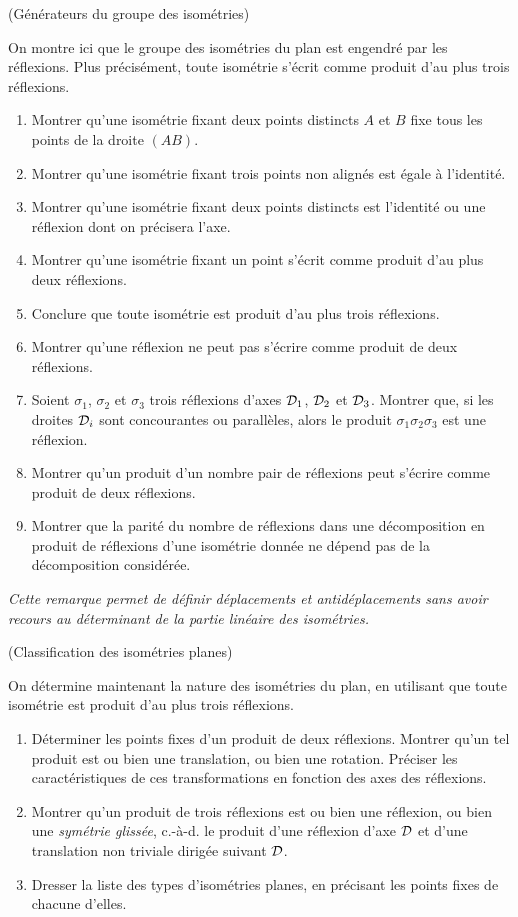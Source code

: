 \documentclass[a4paper,11pt,reqno]{amsart}
\begin{document}
\begin{exo} (Générateurs du groupe des isométries)

  On montre ici que le groupe des isométries du plan est engendré par les réflexions. Plus précisément, toute isométrie s'écrit comme produit d'au plus trois réflexions.
  \begin{enumerate}
    \item Montrer qu'une isométrie fixant deux points distincts $A$ et $B$ fixe tous les points de la droite $(AB)$.
    \item Montrer qu'une isométrie fixant trois points non alignés est égale à l'identité.
    \item Montrer qu'une isométrie fixant deux points distincts est l'identité ou une réflexion dont on précisera l'axe.
    \item Montrer qu'une isométrie fixant un point s'écrit comme produit d'au plus deux réflexions.
    \item Conclure que toute isométrie est produit d'au plus trois réflexions.
    \item Montrer qu'une réflexion ne peut pas s'écrire comme produit de deux réflexions.
    \item Soient $\sigma_1$, $\sigma_2$ et $\sigma_3$ trois réflexions d'axes $\mathcal{D}_1$, $\mathcal{D}_2$ et $\mathcal{D}_3$. Montrer que, si les droites $\mathcal{D}_i$ sont concourantes ou parallèles, alors le produit $\sigma_1 \sigma_2 \sigma_3$ est une réflexion.
    \item Montrer qu'un produit d'un nombre pair de réflexions peut s'écrire comme produit de deux réflexions.
    \item Montrer que la parité du nombre de réflexions dans une décomposition en produit de réflexions d'une isométrie donnée ne dépend pas de la décomposition considérée.
  \end{enumerate}
  \emph{Cette remarque permet de définir déplacements et antidéplacements sans avoir recours au déterminant de la partie linéaire des isométries.}
\end{exo}

\begin{exo} (Classification des isométries planes)

  On détermine maintenant la nature des isométries du plan, en utilisant que toute isométrie est produit d'au plus trois réflexions.
  \begin{enumerate}
    \item Déterminer les points fixes d'un produit de deux réflexions. Montrer qu'un tel produit est ou bien une translation, ou bien une rotation. Préciser les caractéristiques de ces transformations en fonction des axes des réflexions.
    \item Montrer qu'un produit de trois réflexions est ou bien une réflexion, ou bien une \emph{symétrie glissée}, c.-à-d. le produit d'une réflexion d'axe $\mathcal{D}$ et d'une translation non triviale dirigée suivant $\mathcal{D}$.
    \item Dresser la liste des types d'isométries planes, en précisant les points fixes de chacune d'elles.
  \end{enumerate}
\end{exo}
\end{document}
